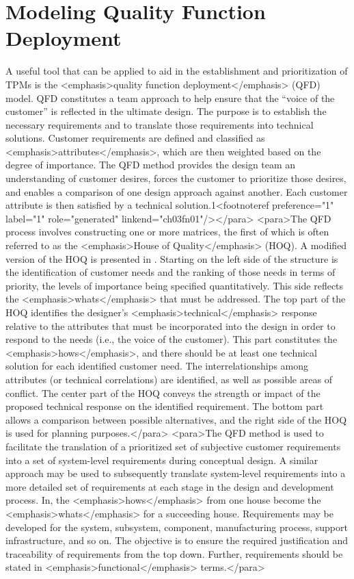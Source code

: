 \section{Modeling Quality Function Deployment}

A useful tool that can be applied to aid in the establishment and prioritization of TPMs is the <emphasis>quality function deployment</emphasis> (QFD) model. QFD constitutes a team approach to help ensure that the “voice of the customer” is reflected in the ultimate design. The purpose is to establish the necessary requirements and to translate those requirements into technical solutions. Customer requirements are defined and classified as <emphasis>attributes</emphasis>, which are then weighted based on the degree of importance. The QFD method provides the design team an understanding of customer desires, forces the customer to prioritize those desires, and enables a comparison of one design approach against another. Each customer attribute is then satisfied by a technical solution.1<footnoteref preference="1" label="1" role="generated" linkend="ch03fn01"/></para>
<para>The QFD process involves constructing one or more matrices, the first of which is often referred to as the <emphasis>House of Quality</emphasis> (HOQ). A modified version of the HOQ is presented in . Starting on the left side of the structure is the identification of customer needs and the ranking of those needs in terms of priority, the levels of importance being specified quantitatively. This side reflects the <emphasis>whats</emphasis> that must be addressed. The top part of the HOQ identifies the designer’s <emphasis>technical</emphasis> response relative to the attributes that must be incorporated into the design in order to respond to the needs (i.e., the voice of the customer). This part constitutes the <emphasis>hows</emphasis>, and there should be at least one technical solution for each identified customer need. The interrelationships among attributes (or technical correlations) are identified, as well as possible areas of conflict. The center part of the HOQ conveys the strength or impact of the proposed technical response on the identified requirement. The bottom part allows a comparison between possible alternatives, and the right side of the HOQ is used for planning purposes.</para>
<para>The QFD method is used to facilitate the translation of a prioritized set of subjective customer requirements into a set of system-level requirements during conceptual design. A similar approach may be used to subsequently translate system-level requirements into a more detailed set of requirements at each stage in the design and development process. In, the <emphasis>hows</emphasis> from one house become the <emphasis>whats</emphasis> for a succeeding house. Requirements may be developed for the system, subsystem, component, manufacturing process, support infrastructure, and so on. The objective is to ensure the required justification and traceability of requirements from the top down. Further, requirements should be stated in <emphasis>functional</emphasis> terms.</para>
